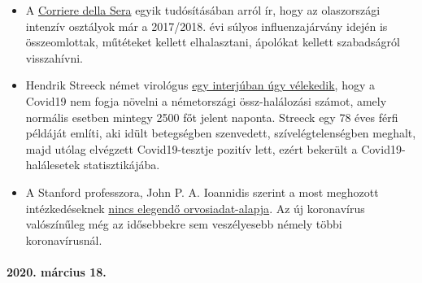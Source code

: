 \begin{itemize}
\tightlist
\item
  A
  \href{https://milano.corriere.it/notizie/cronaca/18_gennaio_10/milano-terapie-intensive-collasso-l-influenza-gia-48-malati-gravi-molte-operazioni-rinviate-c9dc43a6-f5d1-11e7-9b06-fe054c3be5b2.shtml}{Corriere
  della Sera} egyik tudósításában arról ír, hogy az olaszországi
  intenzív osztályok már a 2017/2018. évi súlyos influenzajárvány idején
  is összeomlottak, műtéteket kellett elhalasztani, ápolókat kellett
  szabadságról visszahívni.
\item
  Hendrik Streeck német virológus
  \href{https://www.faz.net/aktuell/gesellschaft/gesundheit/coronavirus/virologe-hendrik-streeck-ueber-corona-neue-symptome-entdeckt-16681450.html?printPagedArticle=true\#pageIndex_2}{egy
  interjúban úgy vélekedik}, hogy a Covid19 nem fogja növelni a
  németországi össz-halálozási számot, amely normális esetben mintegy
  2500 főt jelent naponta. Streeck egy 78 éves férfi példáját említi,
  aki idült betegségben szenvedett, szívelégtelenségben meghalt, majd
  utólag elvégzett Covid19-tesztje pozitív lett, ezért bekerült a
  Covid19-halálesetek statisztikájába.
\item
  A Stanford professzora, John P. A. Ioannidis szerint a most meghozott
  intézkedéseknek
  \href{https://www.statnews.com/2020/03/17/a-fiasco-in-the-making-as-the-coronavirus-pandemic-takes-hold-we-are-making-decisions-without-reliable-data/}{nincs
  elegendő orvosiadat-alapja}. Az új koronavírus valószínűleg még az
  idősebbekre sem veszélyesebb némely többi koronavírusnál.
\end{itemize}

\hypertarget{2020-muxe1rcius-18}{%
\paragraph{2020. március 18.}\label{2020-muxe1rcius-18}}


